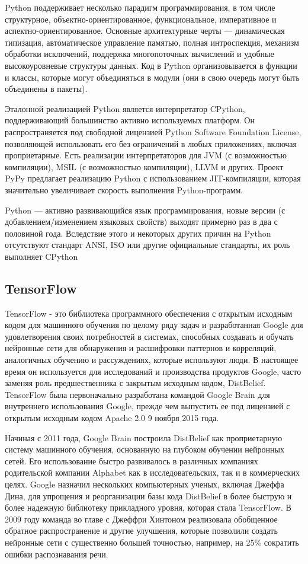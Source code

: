 Python поддерживает несколько парадигм программирования, в том числе структурное, объектно-ориентированное, функциональное, императивное и аспектно-ориентированное. Основные архитектурные черты — динамическая типизация, автоматическое управление памятью, полная интроспекция, механизм обработки исключений, поддержка многопоточных вычислений и удобные высокоуровневые структуры данных. Код в Python организовывается в функции и классы, которые могут объединяться в модули (они в свою очередь могут быть объединены в пакеты).

Эталонной реализацией Python является интерпретатор CPython, поддерживающий большинство активно используемых платформ. Он распространяется под свободной лицензией Python Software Foundation License, позволяющей использовать его без ограничений в любых приложениях, включая проприетарные. Есть реализации интерпретаторов для JVM (с возможностью компиляции), MSIL (с возможностью компиляции), LLVM и других. Проект PyPy предлагает реализацию Python с использованием JIT-компиляции, которая значительно увеличивает скорость выполнения Python-программ.

Python — активно развивающийся язык программирования, новые версии (с добавлением/изменением языковых свойств) выходят примерно раз в два с половиной года. Вследствие этого и некоторых других причин на Python отсутствуют стандарт ANSI, ISO или другие официальные стандарты, их роль выполняет CPython

\subsection{TensorFlow}
\label{sec:development:tensorflow}

TensorFlow - это библиотека программного обеспечения с открытым исходным кодом для машинного обучения по целому ряду задач и разработанная Google для удовлетворения своих потребностей в системах, способных создавать и обучать нейронные сети для обнаружения и расшифровки паттернов и корреляций, аналогичных обучению и рассуждениях, которые используют люди. В настоящее время он используется для исследований и производства продуктов Google, часто заменяя роль предшественника с закрытым исходным кодом, DistBelief. TensorFlow была первоначально разработана командой Google Brain для внутреннего использования Google, прежде чем выпустить ее под лицензией с открытым исходным кодом Apache 2.0 9 ноября 2015 года.

Начиная с 2011 года, Google Brain построила DistBelief как проприетарную систему машинного обучения, основанную на глубоком обучении нейронных сетей. Его использование быстро развивалось в различных компаниях родительской компании Alphabet как в исследовательских, так и в коммерческих целях. Google назначил нескольких компьютерных ученых, включая Джеффа Дина, для упрощения и реорганизации базы кода DistBelief в более быструю и более надежную библиотеку прикладного уровня, которая стала TensorFlow. В 2009 году команда во главе с Джеффри Хинтоном реализовала обобщенное обратное распространение и другие улучшения, которые позволили создать нейронные сети с существенно большей точностью, например, на 25\% сократить ошибки распознавания речи.


